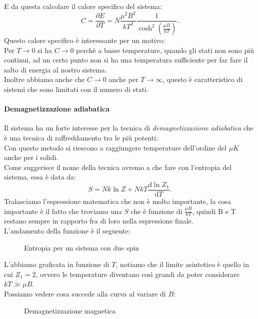 E da questa calcolare il calore specifico del sistema:
\[
	C = \frac{\partial E}{\partial T} = N \frac{\mu^2B^2}{kT^2} \frac{1}{\cosh^2\left( \frac{\mu B}{kT} \right) }
.\] 
Questo calore specifico è interessante per un motivo:\\
Per $T \rightarrow 0$ si ha $C \rightarrow 0$ perchè a basse temperature, quando gli stati non sono più continui, ad un certo punto non si ha una temperatura sufficiente per far fare il salto di energia al nostro sistema.\\
Inoltre abbiamo anche che $C \rightarrow 0 $ anche per $ T \rightarrow \infty$, questo è caratteristico di sistemi che sono limitati con il numero di stati. \\

\paragraph{Demagnetizzazione adiabatica}%
Il sistema ha un forte interesse per la tecnica di \textit{demagnetizzazione adiabatica} che è una tecnica di raffreddamento tra le più potenti:\\
Con questo metodo si riescono a raggiungere temperature dell'ordine del $\mu K$ anche per i solidi. \\
Come suggerisce il nome della tecnica avremo a che fare con l'entropia del sistema, essa è data da:
 \[
	S = Nk \ln Z + NkT \frac{\mbox{d} \ln Z_{1}}{\mbox{d} T} 
.\] 
Tralasciamo l'espressione matematica che non è molto importante, la cosa importante è il fatto che troviamo una $S$ che è funzione di $\frac{\mu B}{kT}$, quindi B e T restano sempre in rapporto fra di loro nella espressione finale.\\
L'andamento della funzione è il seguente:
\begin{figure}[H]
    \centering
    \caption{Entropia per un sistema con due spin}
    \label{fig:entropia-per-sistema-con-due-spin}
\end{figure}
\noindent
L'abbiamo graficata in funzione di $T$, notiamo che il limite asintotico è quello in cui $Z_1 = 2$, ovvero le temperature diventano così grandi da poter considerare $kT \gg \mu B$. \\
Possiamo vedere cosa succede alla curva al variare di $B$:
\begin{figure}[H]
    \centering
    \caption{Demagnetizzazione magnetica}
    \label{fig:demagnetizzazione-magnetica}
\end{figure}

